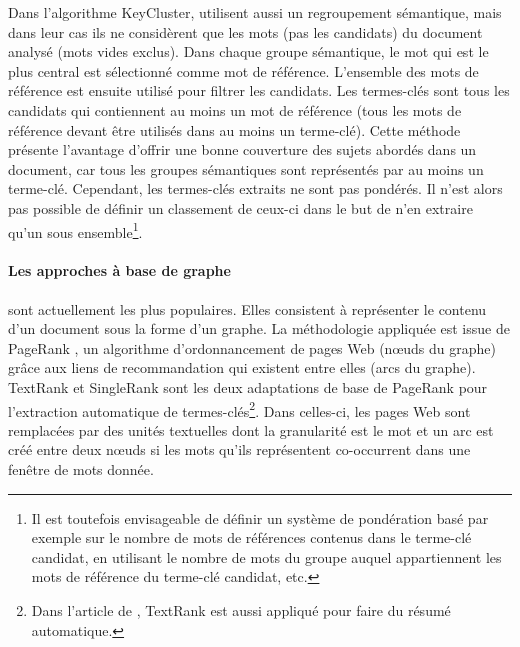           Dans l'algorithme KeyCluster,  \citet{liu2009keycluster} utilisent
          aussi un regroupement sémantique, mais dans leur cas ils ne
          considèrent que les mots (pas les candidats) du document analysé (mots
          vides exclus). Dans chaque groupe sémantique, le mot qui est le plus
          central est sélectionné comme mot de référence. L'ensemble des mots de
          référence est ensuite utilisé pour filtrer les candidats. Les
          termes-clés sont tous les candidats qui contiennent au moins un mot de
          référence (tous les mots de référence devant être utilisés dans au
          moins un terme-clé). Cette méthode présente l'avantage d'offrir une
          bonne couverture des sujets abordés dans un document, car tous les
          groupes sémantiques sont représentés par au moins un terme-clé.
          Cependant, les termes-clés extraits ne sont pas pondérés. Il n'est
          alors pas possible de définir un classement de ceux-ci dans le but de
          n'en extraire qu'un sous ensemble\footnote{Il est toutefois
          envisageable de définir un système de pondération basé par exemple sur
          le nombre de mots de références contenus dans le terme-clé candidat,
          en  utilisant le nombre de mots du groupe auquel appartiennent les
          mots de référence du terme-clé candidat, etc.}.

        \paragraph{Les approches à base de graphe}
          sont actuellement les plus populaires. Elles consistent à représenter
          le contenu d'un document sous la forme d'un graphe. La méthodologie
          appliquée est issue de PageRank \citep{brin1998pagerank}, un
          algorithme d'ordonnancement de pages Web (n\oe{}uds du graphe) grâce
          aux liens de recommandation qui existent entre elles (arcs du graphe).
          TextRank \citep{mihalcea2004textrank} et SingleRank
          \citep{wan2008expandrank} sont les deux adaptations de base de
          PageRank pour l'extraction automatique de termes-clés\footnote{Dans
          l'article de \citet{mihalcea2004textrank}, TextRank est aussi appliqué
          pour faire du résumé automatique.}. Dans celles-ci, les pages Web sont
          remplacées par des unités textuelles dont la granularité est le mot et
          un arc est créé entre deux n\oe{}uds si les mots qu'ils représentent
          co-occurrent dans une fenêtre de mots donnée.
        
